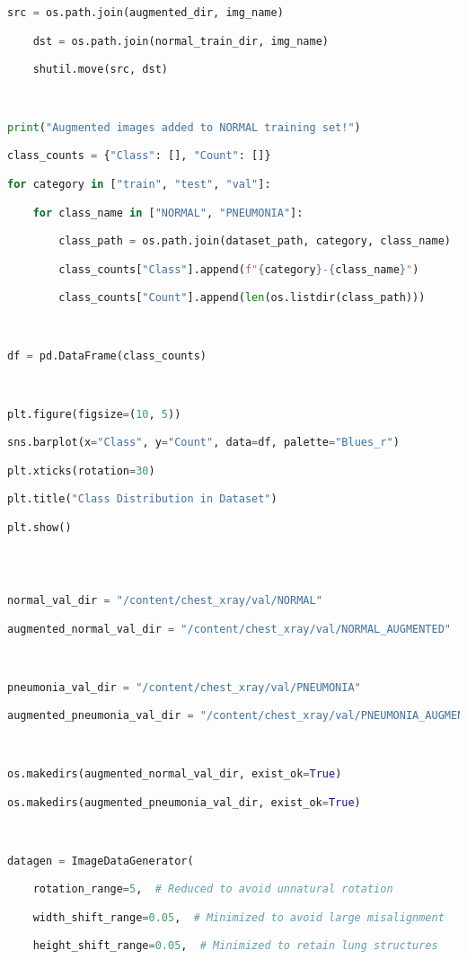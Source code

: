 \documentclass{article}
\begin{document}
\begin{lstlisting}[style=mystyle,language=Python]
    src = os.path.join(augmented_dir, img_name)

    dst = os.path.join(normal_train_dir, img_name)

    shutil.move(src, dst)



print("Augmented images added to NORMAL training set!")

class_counts = {"Class": [], "Count": []}

for category in ["train", "test", "val"]:

    for class_name in ["NORMAL", "PNEUMONIA"]:

        class_path = os.path.join(dataset_path, category, class_name)

        class_counts["Class"].append(f"{category}-{class_name}")

        class_counts["Count"].append(len(os.listdir(class_path)))



df = pd.DataFrame(class_counts)



plt.figure(figsize=(10, 5))

sns.barplot(x="Class", y="Count", data=df, palette="Blues_r")

plt.xticks(rotation=30)

plt.title("Class Distribution in Dataset")

plt.show()




normal_val_dir = "/content/chest_xray/val/NORMAL"

augmented_normal_val_dir = "/content/chest_xray/val/NORMAL_AUGMENTED"



pneumonia_val_dir = "/content/chest_xray/val/PNEUMONIA"

augmented_pneumonia_val_dir = "/content/chest_xray/val/PNEUMONIA_AUGMENTED"



os.makedirs(augmented_normal_val_dir, exist_ok=True)

os.makedirs(augmented_pneumonia_val_dir, exist_ok=True)



datagen = ImageDataGenerator(

    rotation_range=5,  # Reduced to avoid unnatural rotation

    width_shift_range=0.05,  # Minimized to avoid large misalignment

    height_shift_range=0.05,  # Minimized to retain lung structures


\end{lstlisting}
\end{document}
